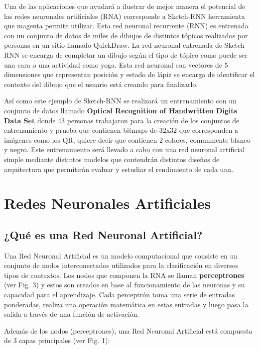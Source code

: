 \documentclass[journal]{IEEEtai}
\begin{document}
Una de las aplicaciones que ayudará a ilustrar de mejor manera el potencial de las redes neuronales artificiales (RNA) corresponde a Sketch-RNN \cite{sketchrnn} herramienta que magenta permite utilizar. Esta red neuronal recurrente (RNN) es entrenada con un conjunto de datos de miles de dibujos de distintos tópicos realizados por personas en un sitio llamado QuickDraw. La red neuronal entrenada de Sketch RNN se encarga de completar un dibujo según el tipo de tópico como puede ser una cara o una actividad como yoga. Esta red neuronal con vectores de 5 dimensiones que representan posición y estado de lápiz se encarga de identificar el contexto del dibujo que el usuario está creando para finalizarlo.

Así como este ejemplo de Sketch-RNN se realizará un entrenamiento con un conjunto de datos llamado \textbf{Optical Recognition of Handwritten Digits Data Set} \cite{dataset} donde 43 personas trabajaron para la creación de los conjuntos de entrenamiento y prueba que contienen bitmaps de 32x32 que corresponden a imágenes como los QR, quiere decir  que contienen 2 colores, comunmente blanco y negro. Este entrenamiento será llevado a cabo con una red neuronal artificial simple mediante distintos modelos que contendrán distintos diseños de arquitectura que permitirán evaluar y estudiar el rendimiento de cada una.

\section{Redes Neuronales Artificiales}

\subsection{¿Qué es una Red Neuronal Artificial?}

Una Red Neuronal Artificial es un modelo computacional que consiste en un conjunto de nodos interconectados utilizados para la clasificación en diversos tipos de contextos. Los nodos que componen la RNA se llaman \textbf{perceptrones} (ver Fig. 3) y estos son creados en base al funcionamiento de las neuronas y su capacidad para el aprendizaje. Cada perceptrón toma una serie de entradas ponderadas, realiza una operación matemática en estas entradas y luego pasa la salida a través de una función de activación.

Además de los nodos (perceptrones), una Red Neuronal Artificial está compuesta de 3 capas principales (ver Fig. 1): 
\end{document}
